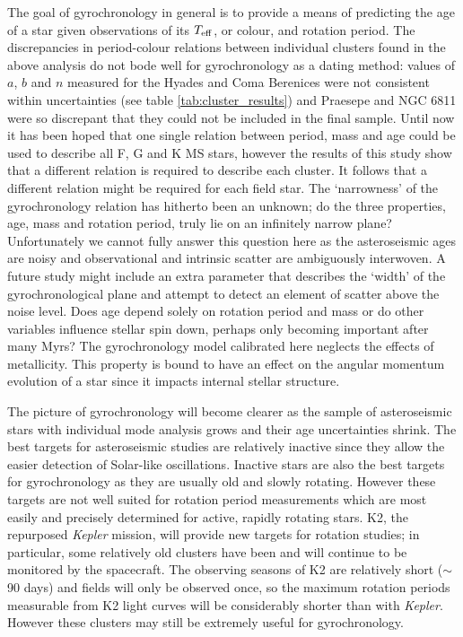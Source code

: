 \documentclass[useAMS, usenatbib]{mn2e}
\newcommand{\teff}{$T_{\rm{eff}}$}
\begin{document}
The goal of gyrochronology in general is to provide a means of predicting the
age of a star given observations of its \teff, or colour, and rotation period.
The discrepancies in period-colour relations between individual clusters found
in the above analysis do not bode well for gyrochronology as a dating method:
values of $a$, $b$ and $n$ measured for the Hyades and Coma Berenices were not
consistent within uncertainties (see table \ref{tab:cluster_results}) and
Praesepe and NGC 6811 were so discrepant that they could not be included in
the final sample.
Until now it has been hoped that one single relation between period, mass and
age could be used to describe all F, G and K MS stars, however the results of
this study show that a different relation is required to describe each
cluster.
It follows that a different relation might be required for each field star.
The `narrowness' of the gyrochronology relation has hitherto been an unknown;
do the three properties, age, mass and rotation period, truly lie on an
infinitely narrow plane?
Unfortunately we cannot fully answer this question here as the asteroseismic
ages are noisy and observational and intrinsic scatter are ambiguously
interwoven.
A future study might include an extra parameter that describes the `width' of
the gyrochronological plane and attempt to detect an element of scatter above
the noise level.
Does age depend solely on rotation period and mass or do other variables
influence stellar spin down, perhaps only becoming important after many Myrs?
The gyrochronology model calibrated here neglects the effects of metallicity.
This property is bound to have an effect on the angular momentum evolution
of a star since it impacts internal stellar structure.

The picture of gyrochronology will become clearer as the sample of
asteroseismic stars with individual mode analysis grows and their age
uncertainties shrink.
The best targets for asteroseismic studies are relatively inactive since they
allow the easier detection of Solar-like oscillations.
Inactive stars are also the best targets for gyrochronology as they are
usually old and slowly rotating.
However these targets are not well suited for
rotation period measurements which are most easily and precisely determined
for active, rapidly rotating stars.
K2, the repurposed {\it Kepler} mission, will provide new targets for rotation
studies; in particular, some relatively old clusters have been and will
continue to be monitored by the spacecraft.
The observing seasons of K2 are relatively short ($\sim$ 90 days) and fields
will only be observed once, so the maximum rotation periods measurable from
K2 light curves will be considerably shorter than with {\it Kepler}.
However these clusters may still be extremely useful for gyrochronology.
\end{document}
